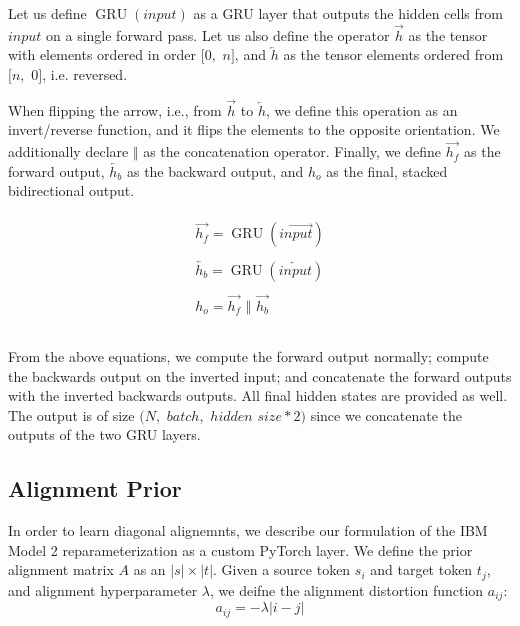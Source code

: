 \documentclass[twoside,twocolumn]{article}
\begin{document}
Let us define $\operatorname{GRU}(input)$ as a GRU layer that outputs the hidden cells from $input$ on a single forward pass. Let us also define the operator $\overrightarrow{h}$ as the tensor with elements ordered in order $[0,$ $n]$, and $\overleftarrow{h}$ as the tensor elements ordered from $[n,$ $0]$, i.e. reversed.

When flipping the arrow, i.e., from $\overrightarrow{h}$ to $\overleftarrow{h}$, we define this operation as an invert/reverse function, and it flips the elements to the opposite orientation. We additionally declare $\Vert$ as the concatenation operator. Finally, we define $\overrightarrow{h_f}$ as the forward output, $\overleftarrow{h_b}$ as the backward output, and $h_o$ as the final, stacked bidirectional output.

\begin{equation}
  \label{eq:bidirectional}
  \begin{split}
    \begin{array}{ll}
      \overrightarrow{h_f} = \operatorname{GRU}(\overrightarrow{input})\\
      \\
      \overleftarrow{h_b} = \operatorname{GRU}(\overleftarrow{input})\\
      \\
      h_o = \overrightarrow{h_f} \,\,\Vert \,\, \overrightarrow{h_b}\\
      \\
    \end{array}
  \end{split}
\end{equation}

From the above equations, we compute the forward output normally; compute the backwards output on the inverted input; and concatenate the forward outputs with the inverted backwards outputs. All final hidden states are provided as well. The output is of size $(N,$ $batch,$ $hidden$ $size*2)$ since we concatenate the outputs of the two GRU layers.


\subsection{Alignment Prior}
\label{sec:alingment_prior}
In order to learn diagonal alignemnts, we describe our formulation of the IBM Model 2 reparameterization as a custom PyTorch layer. We define the prior alignment matrix $A$ as an $|s| \times |t|$. Given a source token $s_i$ and target token $t_j$, and alignment hyperparameter $\lambda$, we deifne the alignment distortion function $a_{ij}$:
\begin{equation}
  a_{ij} = -\lambda | i - j |
\end{equation}
\end{document}
